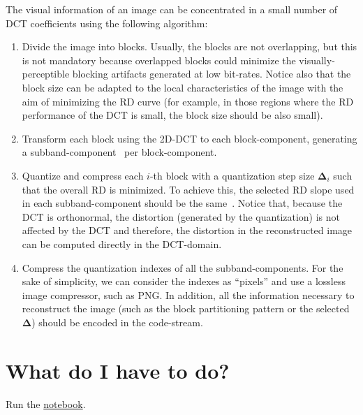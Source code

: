 The visual information of an image can be concentrated in a small
number of DCT coefficients using the following algorithm:
\begin{enumerate}
\item Divide the image into blocks. Usually, the blocks are not
  overlapping, but this is not mandatory because overlapped blocks
  could minimize the visually-perceptible blocking artifacts generated
  at low bit-rates. Notice also that the block size can be adapted to
  the local characteristics of the image with the aim of minimizing
  the RD curve (for example, in those regions where the RD performance
  of the DCT is small, the block size should be also small).
\item Transform each block using the 2D-DCT to each block-component,
  generating a subband-component~\cite{vruiz__transform_coding} per
  block-component.
\item Quantize and compress each $i$-th block with a quantization step
  size ${\mathbf\Delta}_i$ such that the overall RD is minimized. To
  achieve this, the selected RD slope used in each subband-component
  should be the same~\cite{vetterli2014foundations}. Notice that,
  because the DCT is orthonormal, the distortion (generated by the
  quantization) is not affected by the DCT and therefore, the
  distortion in the reconstructed image can be computed directly in
  the DCT-domain.
\item Compress the quantization indexes of all the
  subband-components. For the sake of simplicity, we can consider the
  indexes as ``pixels'' and use a lossless image compressor, such as
  PNG. In addition, all the information necessary to reconstruct the image
  (such as the block partitioning pattern or the selected
  ${\mathbf\Delta}$) should be encoded in the code-stream.
\end{enumerate}

\section{What do I have to do?}
Run the \href{https://github.com/Sistemas-s-Multimedia.github.io/blob/master/contents/2D_DCT/RD_performance.ipynb}{notebook}.

